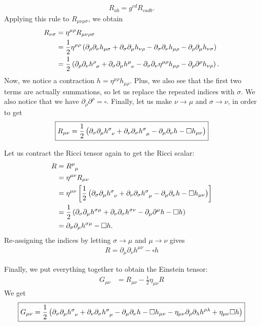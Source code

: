 \documentclass{book}
\numberwithin{equation}{section}
\theoremstyle{definition}
\newcommand{\p}{\partial}
\newcommand{\f}[2]{\frac{#1}{#2}}
\newcommand{\lp}{\left(}
\newcommand{\rp}{\right)}
\newcommand{\lb}{\left[}
\newcommand{\rb}{\right]}
\begin{document}
\begin{align}
R_{ab} = g^{cd}R_{cadb}.
\end{align}
Applying this rule to $R_{\mu\nu\rho\sigma}$, we obtain
\begin{align}
R_{\nu\sigma} &= \eta^{\mu\rho}R_{\mu\nu\rho\sigma} \\ 
&= \f{1}{2}\eta^{\mu\rho}\lp  \p_\rho\p_\nu h_{\mu\sigma} + \p_\sigma\p_\mu h_{\nu\rho} - \p_\sigma\p_\nu h_{\mu\rho} - \p_\rho \p_\mu h_{\nu\sigma}  \rp \\
&= \f{1}{2}\lp \p_\rho \p_\nu \tensor{h}{^\rho_\sigma} + \p_\sigma\p_\mu \tensor{h}{^\mu_\nu} - \p_\sigma\p_\nu \eta^{\mu\rho}h_{\mu\rho} - \p_\rho\p^\rho h_{\nu\rho}\rp.
\end{align}
Now, we notice a contraction $h = \eta^{\mu\rho}h_{\mu\rho}$. Plus, we also see that the first two terms are actually summations, so let us replace the repeated indices with $\sigma$. We also notice that we have $\p_\rho \p^\rho = \square$. Finally, let us make $\nu\to \mu$ and $\sigma \to \nu$, in order to get
\begin{align}
\boxed{R_{\mu\nu} = \f{1}{2}
\lp 
\p_\sigma\p_\mu \tensor{h}{^\sigma_\nu} + \p_\nu \p_\sigma \tensor{h}{^\sigma_\mu}
- \p_\mu\p_\nu h - \square h_{\mu\nu}
\rp}
\end{align}


Let us contract the Ricci tensor again to get the Ricci scalar:
\begin{align}
R &= \tensor{R}{^\mu_\mu}\\
&= \eta^{\mu\nu}R_{\mu\nu}\\
&= \eta^{\mu\nu}\lb \f{1}{2}
\lp 
\p_\sigma\p_\mu \tensor{h}{^\sigma_\nu} + \p_\nu \p_\sigma \tensor{h}{^\sigma_\mu}
- \p_\mu\p_\nu h - \square h_{\mu\nu}
\rp \rb\\
&=  \f{1}{2}\lp \p_\sigma \p_\mu h^{\sigma\mu} + \p_\nu\p_\sigma h^{\sigma\nu} - \p_\mu \p^\mu h - \square h \rp\\
&= \p_\sigma \p_\mu h^{\sigma\mu} - \square h.
\end{align}
Re-assigning the indices by letting $\sigma \to \mu$ and $\mu\to\nu $ gives
\begin{align}
\boxed{R = \p_\mu \p_\nu h^{\mu\nu} - \square h}
\end{align}


Finally, we put everything together to obtain the Einstein tensor:
\begin{align}
G_{\mu\nu} &= R_{\mu\nu} - \f{1}{2}\eta_{\mu\nu}R
\end{align}
We get
\begin{align}
\boxed{G_{\mu\nu} = \f{1}{2}\lp  \p_\sigma\p_\mu \tensor{h}{^\sigma_\nu} + \p_\nu \p_\sigma \tensor{h}{^\sigma_\mu}- \p_\mu\p_\nu h - \square h_{\mu\nu} - \eta_{\mu\nu}\p_\rho\p_\lambda h^{\rho\lambda} + \eta_{\mu\nu}\square h  \rp}
\end{align}
\end{document}
